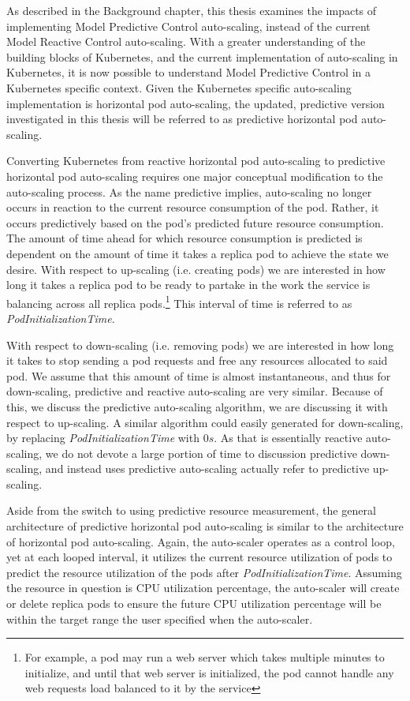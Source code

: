 As described in the Background chapter, this thesis examines the impacts of
implementing Model Predictive Control auto-scaling, instead of the current Model Reactive
Control auto-scaling. With a greater understanding of the building blocks of
Kubernetes, and the current implementation of auto-scaling in Kubernetes, it is
now possible to understand Model Predictive Control in a Kubernetes specific
context. Given the Kubernetes specific auto-scaling implementation is horizontal
pod auto-scaling, the updated, predictive version investigated in this thesis
will be referred to as predictive horizontal pod auto-scaling.

Converting Kubernetes from reactive horizontal pod auto-scaling to predictive
horizontal pod auto-scaling requires one major conceptual modification to the
auto-scaling process. As the name predictive implies, auto-scaling no longer
occurs in reaction to the current resource consumption of the pod. Rather, it occurs
predictively based on the pod's predicted future resource consumption. The
amount of time ahead for which resource consumption is predicted is dependent on
the amount of time it takes a replica pod to achieve the state we desire. With
respect to up-scaling (i.e. creating pods) we are interested in how long it
takes a replica pod to be ready to partake in the work the
service is balancing across all replica pods.\footnote{For example, a pod may
run a web server which takes multiple minutes to initialize, and until that web server
is initialized, the pod cannot handle any web requests load balanced to it by
the service} This interval of time is referred to as \textit{PodInitializationTime}.

With respect to down-scaling (i.e. removing pods) we are interested in how long
it takes to stop sending a pod requests and free any resources allocated to said
pod. We assume that this amount of time is almost instantaneous, and thus for
down-scaling, predictive and reactive auto-scaling are very similar. Because of
this, we discuss the predictive auto-scaling algorithm, we are discussing it
with respect to up-scaling. A similar algorithm could easily generated for
down-scaling, by replacing \textit{PodInitializationTime} with $0s$. As that is
essentially reactive auto-scaling, we do not devote a large portion of time to
discussion predictive down-scaling, and instead uses predictive auto-scaling
actually refer to predictive up-scaling.

Aside from the switch to using predictive resource measurement, the
general architecture of predictive horizontal pod auto-scaling is similar to the
architecture of horizontal pod auto-scaling. Again, the auto-scaler operates as a
control loop, yet at each looped interval, it utilizes the current resource
utilization of pods to predict the resource utilization of the pods after
\textit{PodInitializationTime}. Assuming the resource in question is CPU
utilization percentage, the auto-scaler will create or delete replica pods
to ensure the future CPU utilization percentage will be within the target range
the user specified when the auto-scaler.
